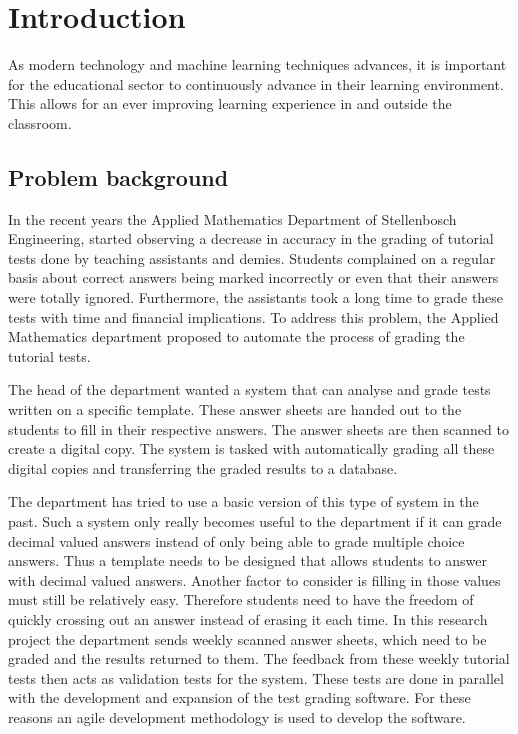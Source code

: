 \chapter{Introduction}
\label{ch:Introduction}
\graphicspath{{Chapter1/Chapter1Figures/}}
As modern technology and machine learning techniques advances, it is important for the educational sector to continuously advance in their learning environment. This allows for an ever improving learning experience in and outside the classroom. 

\section{Problem background}

In the recent years the Applied Mathematics Department of Stellenbosch Engineering, started observing a decrease in accuracy in the grading of tutorial tests done by teaching assistants and demies.  Students complained on a regular basis about correct answers being marked incorrectly or even that their answers were totally ignored. Furthermore, the assistants took a long time to grade these tests with time and financial implications. To address this problem, the Applied Mathematics department proposed to automate the process of grading the tutorial tests.

The head of the department wanted a system that can analyse and grade tests written on a specific template. These answer sheets are handed out to the students to fill in their respective answers. The answer sheets are then scanned to create a digital copy. The system is tasked with automatically grading all these digital copies and transferring the graded results to a database.

The department has tried to use a basic version of this type of system in the past. Such a system only really becomes useful to the department if it can grade decimal valued answers instead of only being able to grade multiple choice answers. Thus a template needs to be designed that allows students to answer with decimal valued answers. Another factor to consider is filling in those values must still be relatively easy. Therefore students need to have the freedom of quickly crossing out an answer instead of erasing it each time.
In this research project the department sends weekly scanned answer sheets, which need to be graded and the results returned to them. The feedback from these weekly tutorial tests then acts as validation tests for the system. These tests are done in parallel with the development and expansion of the test grading software. For these reasons an agile development methodology is used to develop the software.

